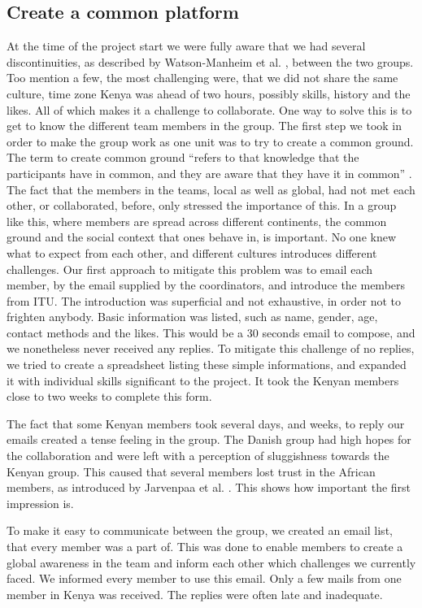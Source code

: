 \subsection{Create a common platform} \label{sec:commonplatform}
At the time of the project start we were fully aware that we had several discontinuities, as described by Watson-Manheim et al. \cite{watson2007distance}, between the two groups. Too mention a few, the most challenging were, that we did not share the same culture, time zone \textemdash Kenya was ahead of two hours\textemdash, possibly skills, history and the likes. All of which makes it a challenge to collaborate. One way to solve this is to get to know the different team members in the group. The first step we took in order to make the group work as one unit was to try to create a common ground. The term to create common ground ``refers to that knowledge that the participants have in common, and they are aware that they have it in common'' \cite{olson:2000:distance}. The fact that the members in the teams, local as well as global, had not met each other, or collaborated, before, only stressed the importance of this. In a group like this, where members are spread across different continents, the common ground and the social context that ones behave in, is important. No one knew what to expect from each other, and different cultures introduces different challenges. Our first approach to mitigate this problem was to email each member, by the email supplied by the coordinators, and introduce the members from ITU. The introduction was superficial and not exhaustive, in order not to frighten anybody. Basic information was listed, such as name, gender, age, contact methods and the likes. This would be a 30 seconds email to compose, and we nonetheless never received any replies. To mitigate this challenge of no replies, we tried to create a spreadsheet listing these simple informations, and expanded it with individual skills significant to the project. It took the Kenyan members close to two weeks to complete this form. 

The fact that some Kenyan members took several days, and weeks, to reply our emails created a tense feeling in the group. The Danish group had high hopes for the collaboration and were left with a perception of sluggishness towards the Kenyan group. This caused that several members lost trust in the African members, as introduced by Jarvenpaa et al. \cite{jarvenpaa1998communication}. This shows how important the first impression is.

To make it easy to communicate between the group, we created an email list, that every member was a part of. This was done to enable members to create a global awareness \cite{leinonen2005conceptualizing} in the team and inform each other which challenges we currently faced. We informed every member to use this email. Only a few mails from one member in Kenya was received. The replies were often late and inadequate.

